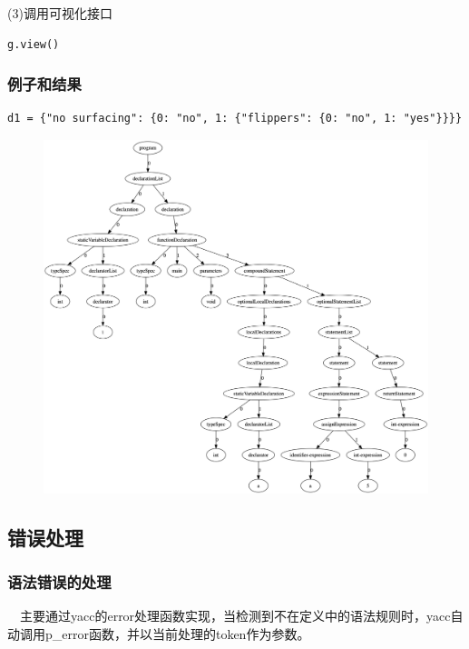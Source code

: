 \documentclass{article}
\begin{document}
(3)调用可视化接口


\begin{verbatim}
g.view()
\end{verbatim}

\subsubsection{例子和结果}

\begin{verbatim}
d1 = {"no surfacing": {0: "no", 1: {"flippers": {0: "no", 1: "yes"}}}}
\end{verbatim}

\begin{figure}[H]
	\centering
 	\includegraphics[width=\linewidth]{img/tree.png}
\end{figure}
\subsection{错误处理}

\subsubsection{语法错误的处理}

\quad\ \ 主要通过yacc的error处理函数实现，当检测到不在定义中的语法规则时，yacc自动调用p\_error函数，并以当前处理的token作为参数。
\end{document}
